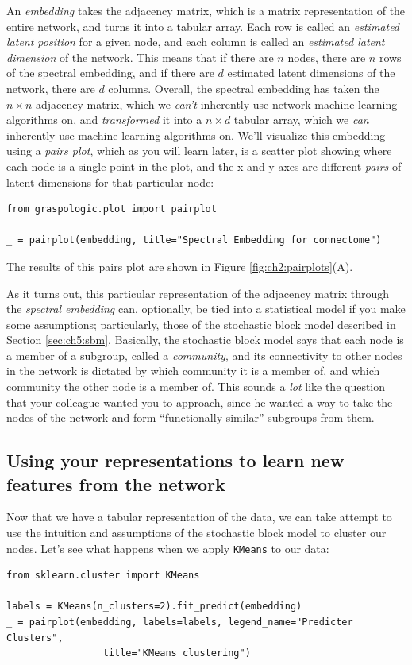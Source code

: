 An \emph{embedding} takes the adjacency matrix, which is a matrix representation of the entire network, and turns it into a tabular array. Each row is called an \emph{estimated latent position} for a given node, and each column is called an \emph{estimated latent dimension} of the network. This means that if there are $n$ nodes, there are $n$ rows of the spectral embedding, and if there are $d$ estimated latent dimensions of the network, there are $d$ columns. Overall, the spectral embedding has taken the $n \times n$ adjacency matrix, which we \emph{can't} inherently use network machine learning algorithms on, and \emph{transformed} it into a $n \times d$ tabular array, which we \emph{can} inherently use machine learning algorithms on. We'll visualize this embedding using a \emph{pairs plot}, which as you will learn later, is a scatter plot showing where each node is a single point in the plot, and the x and y axes are different \emph{pairs} of latent dimensions for that particular node:

\begin{lstlisting}[style=python]
from graspologic.plot import pairplot

_ = pairplot(embedding, title="Spectral Embedding for connectome")
\end{lstlisting}
The results of this pairs plot are shown in Figure \ref{fig:ch2:pairplots}(A).

As it turns out, this particular representation of the adjacency matrix through the \emph{spectral embedding} can, optionally, be tied into a statistical model if you make some assumptions; particularly, those of the stochastic block model described in Section \ref{sec:ch5:sbm}. Basically, the stochastic block model says that each node is a member of a subgroup, called a \emph{community}, and its connectivity to other nodes in the network is dictated by which community it is a member of, and which community the other node is a member of. This sounds a \emph{lot} like the question that your colleague wanted you to approach, since he wanted a way to take the nodes of the network and form ``functionally similar'' subgroups from them. 

\subsection{Using your representations to learn new features from the network}

Now that we have a tabular representation of the data, we can take attempt to use the intuition and assumptions of the stochastic block model to cluster our nodes. Let's see what happens when we apply \texttt{KMeans} to our data:
\begin{lstlisting}[style=python]
from sklearn.cluster import KMeans

labels = KMeans(n_clusters=2).fit_predict(embedding)
_ = pairplot(embedding, labels=labels, legend_name="Predicter Clusters", 
                 title="KMeans clustering")
\end{lstlisting}

